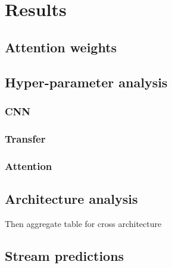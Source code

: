 
\section{Results}
\label{sec:results}

\subsection{Attention weights}


\subsection{Hyper-parameter analysis}



\subsubsection{CNN}

\subsubsection{Transfer}

\subsubsection{Attention}

\subsection{Architecture analysis}

Then aggregate table for cross architecture

\subsection{Stream predictions}

